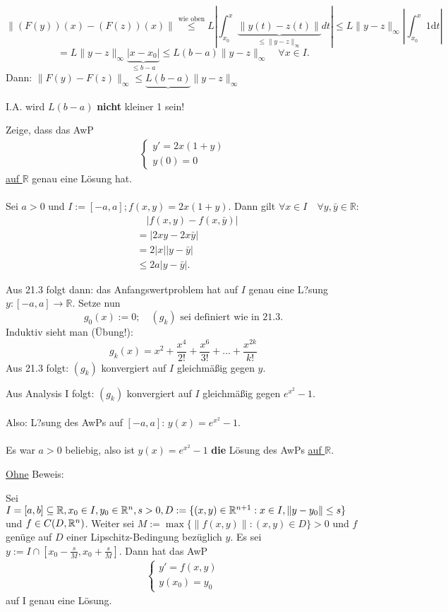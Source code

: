 \documentclass[a4paper,twoside,DIV15,BCOR12mm,chapterprefix=true,headings=twolinechapter]{scrbook}
\begin{document}
\[\|(F(y))(x) -(F(z))(x)\| \stackrel{\text{wie oben}}\leq L \left| \int_{x_0}^x \underbrace{\|y(t)-z(t)\|}_{\leq \|y-z\|_\infty} dt \right| \leq L \|y-z\|_\infty \left| \int_{x_0}^x 1 \text{d}t \right|\]
\[= L \|y-z\|_\infty \underbrace{|x-x_0|}_{\leq b-a} \leq L(b-a) \|y-z\|_\infty \quad \forall x \in I.\]
Dann:  $\|F(y)-F(z)\|_\infty \leq \underbrace{L(b-a)} \|y-z\|_\infty$

I.A. wird $L(b-a)$ \textbf{nicht} kleiner 1 sein!



\begin{beispiel}[zu 21.3]
Zeige, dass das AwP
\begin{align*} \begin{cases}
y' = 2x(1+y)\\
y(0) =  0
\end{cases} \end{align*}
\underline{auf $\mathbb{R}$} genau eine Lösung hat.
\\
\\
Sei $a > 0$ und $I := [-a, a]; f(x,y) = 2x(1+y).$ Dann gilt $\forall x \in I \quad \forall y, \bar y \in \mathbb{R}:$
\begin{align*}
 &\quad |f(x,y)-f(x, \bar y )|\\
&= |2xy-2x\bar y | \\
&= 2|x||y-\bar y | \\
&\leq 2a|y-\bar y |.
\end{align*}

Aus 21.3 folgt dann: das Anfangswertproblem hat auf $I$ genau eine L?sung $y: [-a, a] \to \mathbb{R}$. Setze nun
\[ g_0(x) :=0 ;\quad (g_k) \text{ sei definiert wie in 21.3.} \]
Induktiv sieht man (Übung!):
\[g_k(x) = x^2 + \frac{x^4}{2!} + \frac{x^6}{3!} + ... + \frac{x^{2k}}{k!} \]
Aus 21.3 folgt: $(g_k)$ konvergiert auf $I$ gleichmäßig gegen $y$.

Aus Analysis I folgt: $(g_k)$ konvergiert auf $I$ gleichmäßig gegen $e^{x^2} - 1$.
\\
\\
Also: L?sung des AwPs auf $[-a,a]$: $y(x) = e^{x^2} -1$.
\\
\\
Es war $a > 0$ beliebig, also ist $y(x) = e^{x^2} -1$ \textbf{die} Lösung des AwPs \underline{auf $\mathbb{R}$}.
\end{beispiel}

\underline{Ohne} Beweis:
\begin{satz}
Sei $I=[a,b] \subseteq \mathbb{R}, x_0 \in I, y_0 \in \mathbb{R}^n, s > 0, D := \{(x,y)\in\mathbb{R}^{n+1} : x \in I, \|y-y_0\| \leq s\}$ und $f \in C(D,\mathbb{R}^n)$. Weiter sei $M := \max\{\|f(x,y)\| : (x,y) \in D \} > 0$ und $f$ genüge auf $D$ einer Lipschitz-Bedingung bezüglich $y$. Es sei $y := I \cap [x_0 - \frac{s}{M}, x_0 + \frac{s}{M}]$. Dann hat das AwP
\begin{align*} \begin{cases}
y' = f(x,y)\\
y(x_0) = y_0
\end{cases}
\label{(ii)}
\end{align*}
auf I genau eine Lösung.
\end{satz}
\end{document}
